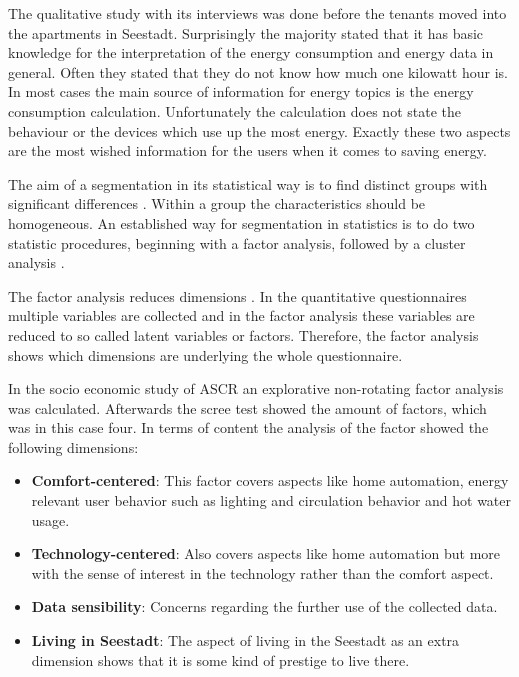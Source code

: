 The qualitative study with its interviews was done before the tenants moved into the apartments in Seestadt. Surprisingly the majority stated that it has basic knowledge for the interpretation of the energy consumption and energy data in general. Often they stated that they do not know how much one kilowatt hour is. In most cases the main source of information for energy topics is the energy consumption calculation. Unfortunately the calculation does not state the behaviour or the devices which use up the most energy. Exactly these two aspects are the most wished information for the users when it comes to saving energy.

The aim of a segmentation in its statistical way is to find distinct groups with significant differences \cite{punj1983cluster}. Within a group the characteristics should be homogeneous. An established way for segmentation in statistics is to do two statistic procedures, beginning with a factor analysis, followed by a cluster analysis \cite{tuffery2011data}.

The factor analysis reduces dimensions \cite{williams2010exploratory}. In the quantitative questionnaires multiple variables are collected and in the factor analysis these variables are reduced to so called latent variables or factors. Therefore, the factor analysis shows which dimensions are underlying the whole questionnaire.

In the socio economic study of ASCR an explorative non-rotating factor analysis was calculated. Afterwards the scree test showed the amount of factors, which was in this case four. In terms of content the analysis of the factor showed the following dimensions:

\begin{itemize}
	\item \textbf{Comfort-centered}: This factor covers aspects like home automation, energy relevant user behavior such as lighting and circulation behavior and hot water usage. 
	\item \textbf{Technology-centered}: Also covers aspects like home automation but more with the sense of interest in the technology rather than the comfort aspect.
	\item \textbf{Data sensibility}: Concerns regarding the further use of the collected data.
	\item \textbf{Living in Seestadt}: The aspect of living in the Seestadt as an extra dimension shows that it is some kind of prestige to live there.
\end{itemize}

